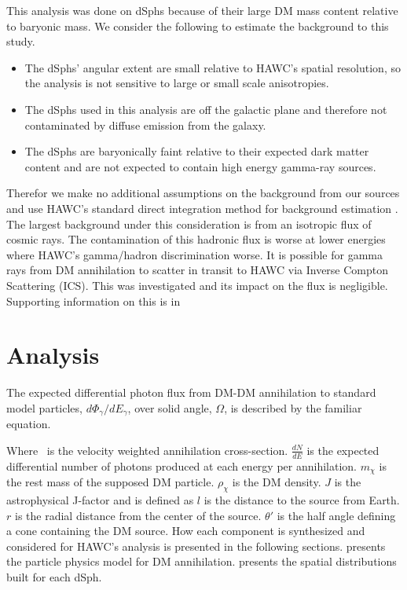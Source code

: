 This analysis was done on dSphs because of their large DM mass content relative to baryonic mass.
We consider the following to estimate the background to this study.

\begin{itemize}
    \item The dSphs' angular extent are small relative to HAWC's spatial resolution, so the analysis is not sensitive to large or small scale anisotropies.
    \item The dSphs used in this analysis are off the galactic plane and therefore not contaminated by diffuse emission from the galaxy.
    \item The dSphs are baryonically faint relative to their expected dark matter content and are not expected to contain high energy gamma-ray sources.
\end{itemize}

Therefor we make no additional assumptions on the background from our sources and use HAWC's standard direct integration method for background estimation \cite{Abeysekara_2017}.
The largest background under this consideration is from an isotropic flux of cosmic rays.
The contamination of this hadronic flux is worse at lower energies where HAWC's gamma/hadron discrimination worse.
It is possible for gamma rays from DM annihilation to scatter in transit to HAWC via Inverse Compton Scattering (ICS).
This was investigated and its impact on the flux is negligible.
Supporting information on this is in 

\section{Analysis}\label{sec:gd_analysis}

The expected differential photon flux from DM-DM annihilation to standard model
particles, $d\Phi_{\gamma}/dE_{\gamma}$, over solid angle, $\Omega$, is described by the familiar equation.
\iddmannilation

Where \sv~is the velocity weighted annihilation cross-section.
$\frac{dN}{dE}$ is the expected differential number of photons produced at each energy per annihilation.
$m_\chi$ is the rest mass of the supposed DM particle.
$\rho_{\chi}$ is the DM density.
$J$ is the astrophysical J-factor and is defined as
\jfactor
$l$ is the distance to the source from Earth.
$r$ is the radial distance from the center of the source.
$\theta'$ is the half angle defining a cone containing the DM source.
How each component is synthesized and considered for HAWC's analysis is presented in the following sections.
 presents the particle physics model for DM annihilation.
 presents the spatial distributions built for each dSph.

